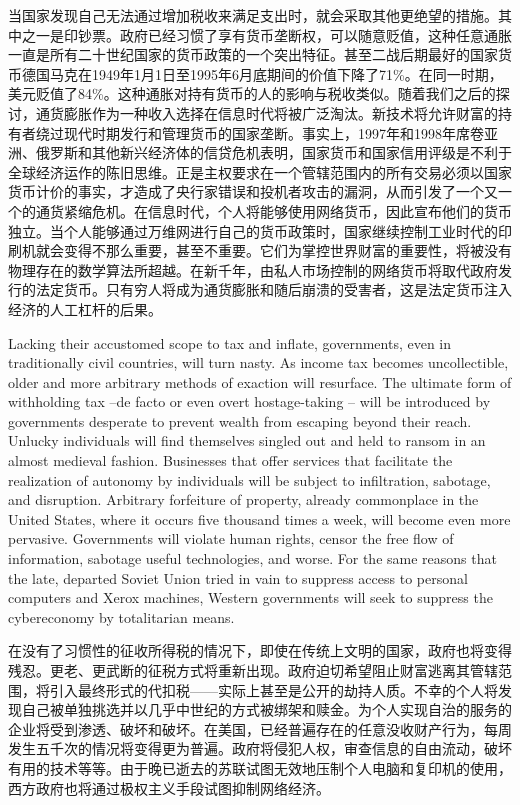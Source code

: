 \begin{Parallel}{97mm}{45mm}
  \ParallelRText
  {\small 当国家发现自己无法通过增加税收来满足支出时，就会采取其他更绝望的措施。其中之一是印钞票。政府已经习惯了享有货币垄断权，可以随意贬值，这种任意通胀一直是所有二十世纪国家的货币政策的一个突出特征。甚至二战后期最好的国家货币德国马克在1949年1月1日至1995年6月底期间的价值下降了71\%。在同一时期，美元贬值了84\%。这种通胀对持有货币的人的影响与税收类似。随着我们之后的探讨，通货膨胀作为一种收入选择在信息时代将被广泛淘汰。新技术将允许财富的持有者绕过现代时期发行和管理货币的国家垄断。事实上，1997年和1998年席卷亚洲、俄罗斯和其他新兴经济体的信贷危机表明，国家货币和国家信用评级是不利于全球经济运作的陈旧思维。正是主权要求在一个管辖范围内的所有交易必须以国家货币计价的事实，才造成了央行家错误和投机者攻击的漏洞，从而引发了一个又一个的通货紧缩危机。在信息时代，个人将能够使用网络货币，因此宣布他们的货币独立。当个人能够通过万维网进行自己的货币政策时，国家继续控制工业时代的印刷机就会变得不那么重要，甚至不重要。它们为掌控世界财富的重要性，将被没有物理存在的数学算法所超越。在新千年，由私人市场控制的网络货币将取代政府发行的法定货币。只有穷人将成为通货膨胀和随后崩溃的受害者，这是法定货币注入经济的人工杠杆的后果。}

  \ParallelPar  

  \ParallelLText
  {Lacking their accustomed scope to tax and inflate, governments, even in traditionally civil countries, will turn nasty. As income tax becomes uncollectible, older and more arbitrary methods of exaction will resurface. The ultimate form of withholding tax --de facto or even overt hostage-taking -- will be introduced by governments desperate to prevent wealth from escaping beyond their reach. Unlucky individuals will find themselves singled out and held to ransom in an almost medieval fashion. Businesses that offer services that facilitate the realization of autonomy by individuals will be subject to infiltration, sabotage, and disruption. Arbitrary forfeiture of property, already commonplace in the United States, where it occurs five thousand times a week, will become even more pervasive. Governments will violate human rights, censor the free flow of information, sabotage useful technologies, and worse. For the same reasons that the late, departed Soviet Union tried in vain to suppress access to personal computers and Xerox machines, Western governments will seek to suppress the cybereconomy by totalitarian means. }
  
  \ParallelRText
  {\small 在没有了习惯性的征收所得税的情况下，即使在传统上文明的国家，政府也将变得残忍。更老、更武断的征税方式将重新出现。政府迫切希望阻止财富逃离其管辖范围，将引入最终形式的代扣税——实际上甚至是公开的劫持人质。不幸的个人将发现自己被单独挑选并以几乎中世纪的方式被绑架和赎金。为个人实现自治的服务的企业将受到渗透、破坏和破坏。在美国，已经普遍存在的任意没收财产行为，每周发生五千次的情况将变得更为普遍。政府将侵犯人权，审查信息的自由流动，破坏有用的技术等等。由于晚已逝去的苏联试图无效地压制个人电脑和复印机的使用，西方政府也将通过极权主义手段试图抑制网络经济。 }
  \ParallelPar


\end{Parallel}
